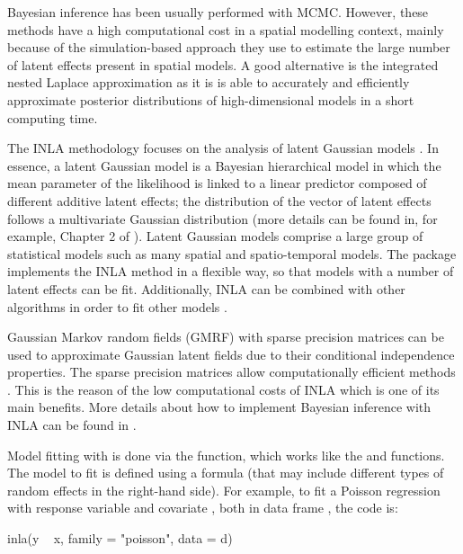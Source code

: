 \medskip
Bayesian inference has been usually performed with MCMC. However, these methods have a high computational cost in a spatial modelling context, mainly because of the simulation-based approach they use to estimate the large number of latent effects present in spatial models. A good alternative is the integrated nested Laplace approximation \citep[INLA,][]{INLA} as it is is able to accurately and efficiently approximate posterior distributions of high-dimensional models in a short computing time.

\medskip
The INLA methodology focuses on the analysis of latent Gaussian models \citep{rueheld:2005}. In essence, a latent Gaussian model is a Bayesian hierarchical model in which the mean parameter of the likelihood is linked to a linear predictor
composed of different additive latent effects; the distribution of the vector
of latent effects follows a multivariate Gaussian distribution (more details can be found in, for example, Chapter 2 of \citealp{rueheld:2005}). Latent Gaussian models comprise a large group of statistical models such as many spatial and spatio-temporal models. The  package implements the INLA method in a flexible way, so that models with a number of latent effects can be fit. Additionally, INLA can be combined with other algorithms in order to fit other models \citep{GomezRubioPalmiPerales:2018}.

\medskip
Gaussian Markov random fields (GMRF) with sparse precision matrices can be used to approximate Gaussian latent fields due to their conditional independence properties. The sparse precision matrices allow computationally efficient methods \citep{rueheld:2005}. This is the reason of the low computational costs of INLA which is one of its main benefits. More details about how to implement Bayesian inference with INLA can be found in \citep{gomez2020bayesian}. 


\medskip
Model fitting with  is done via the  function, which works like the  and  functions. The model to fit is defined using a formula (that may include different types of random effects in the right-hand side). For example, to fit a Poisson regression with response variable  and covariate , both in data frame , the code is:


\medskip
\begin{example*}

inla(y ~ x, family = "poisson", data = d)

\end{example*}

